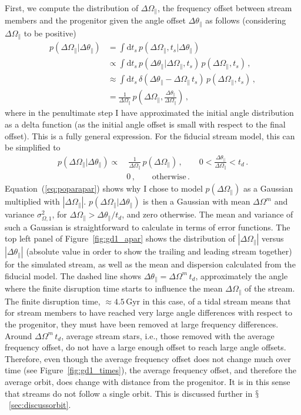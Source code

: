 \documentclass{emulateapj}
\newcommand{\ie}{i.e.}
\newcommand{\dd}{\mathrm{d}}
\newcommand{\Eqnname}{Equation}
\renewcommand{\figurename}{Figure}
\newcommand{\sectionname}{$\mathsection$}
\newcommand{\Gyr}{\ensuremath{\,\mathrm{Gyr}}}
\newcommand{\apar}{\ensuremath{\theta_\parallel}}
\newcommand{\opar}{\ensuremath{\Omega_\parallel}}
\newcommand{\ts}{\ensuremath{t_s}}
\begin{document}
First, we compute the distribution of $\Delta \opar$, the frequency
offset between stream members and the progenitor given the angle
offset $\Delta \apar$ as follows (considering $\Delta \opar$ to be
positive)
\begin{equation}\label{eq:poparapargeneral}
\begin{split}
  p(\Delta \opar|\Delta \apar) & = \int \dd \ts\,p(\Delta \opar,\ts|\Delta \apar)\, \\
  & \propto \int \dd \ts \,p(\Delta \apar | \Delta \opar,\ts)\,p(\Delta \opar,\ts)\,,\\
  & \approx \int \dd \ts \,\delta(\Delta \apar - \Delta \opar\,\ts)\,p(\Delta \opar,\ts)\,,\\
  & = \frac{1}{\Delta \opar}\,p(\Delta \opar,\frac{\Delta \apar}{\Delta \opar})\,,
\end{split}
\end{equation}
where in the penultimate step I have approximated the initial angle
distribution as a delta function (as the initial angle offset is small
with respect to the final offset). This is a fully general
expression. For the fiducial stream model, this can be simplified to
\begin{equation}\label{eq:poparapar}
\begin{split}
  p(\Delta \opar|\Delta \apar) \propto &\ \frac{1}{\Delta \opar}\,p(\Delta \opar)\,,\qquad 0 < \frac{\Delta \apar}{\Delta \opar} < t_d\,.\\
  & 0\,,\qquad \mathrm{otherwise}\,.
\end{split}
\end{equation}
\Eqnname~(\ref{eq:poparapar}) shows why I chose to model $p(\Delta
\opar)$ as a Gaussian multiplied with $|\Delta \opar|$. $p(\Delta
\opar|\Delta \apar)$ is then a Gaussian with mean $\Delta \Omega^m$
and variance $\sigma^2_{\Omega,1}$, for $\Delta \opar > \Delta \apar /
t_d$, and zero otherwise. The mean and variance of such a Gaussian is
straightforward to calculate in terms of error functions. The top left
panel of \figurename~\ref{fig:gd1_apar} shows the distribution of
$|\Delta \opar|$ versus $|\Delta \apar|$ (absolute value in order to
show the trailing and leading stream together) for the simulated
stream, as well as the mean and dispersion calculated from the
fiducial model. The dashed line shows $\Delta \apar = \Delta \Omega^m
\,t_d$, approximately the angle where the finite disruption time
starts to influence the mean $\Delta \opar$ of the stream. The finite
disruption time, $\approx 4.5\Gyr$ in this case, of a tidal stream
means that for stream members to have reached very large angle
differences with respect to the progenitor, they must have been
removed at large frequency differences. Around $\Delta \Omega^m
\,t_d$, average stream stars, \ie, those removed with the average
frequency offset, do not have a large enough offset to reach large
angle offsets. Therefore, even though the average frequency offset
does not change much over time (see \figurename~\ref{fig:gd1_times}),
the average frequency offset, and therefore the average orbit, does
change with distance from the progenitor. It is in this sense that
streams do not follow a single orbit. This is discussed further in
\sectionname~\ref{sec:discussorbit}.
\end{document}
